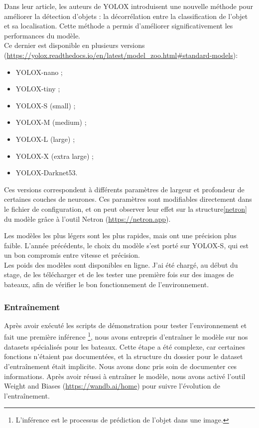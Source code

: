 Dans leur article, les auteurs de YOLOX \cite{Ge_Liu_Wang_Li_Sun_2021} introduisent une nouvelle méthode
pour améliorer la détection d'objets : la décorrélation entre la classification de l'objet et
sa localisation. Cette méthode a permis d'améliorer significativement les performances du modèle.\\

Ce dernier est disponible en plusieurs versions (\url{https://yolox.readthedocs.io/en/latest/model_zoo.html#standard-models}):
\begin{itemize}
    \item YOLOX-nano ;
    \item YOLOX-tiny ;
    \item YOLOX-S (small) ;
    \item YOLOX-M (medium) ;
    \item YOLOX-L (large) ;
    \item YOLOX-X (extra large) ;
    \item YOLOX-Darknet53.
\end{itemize}

Ces versions correspondent à différents paramètres de largeur et profondeur de certaines couches de neurones.
Ces paramètres sont modifiables directement dans le fichier de configuration,
et on peut observer leur effet sur la structure\ref{netron} du modèle grâce à l'outil Netron
(\url{https://netron.app}).

Les modèles les plus légers sont les plus rapides, mais ont une précision plus faible.
L'année précédents, le choix du modèle s'est porté sur YOLOX-S, qui est un bon compromis entre
vitesse et précision.\\

Les poids des modèles sont disponibles en ligne. J'ai été chargé, au début du stage, de les
télécharger et de les tester une première fois sur des images de bateaux, afin de vérifier
le bon fonctionnement de l'environnement.\\

\subsubsection{Entraînement}

Après avoir exécuté les scripts de démonstration pour tester l'environnement
et fait une première inférence \footnote{L'inférence est le processus de prédiction
de l'objet dans une image.}, nous avons entrepris d'entraîner le modèle sur nos datasets spécialisés pour
les bateaux. Cette étape a été complexe, car certaines fonctions n'étaient pas documentées, et
la structure du dossier pour le dataset d'entraînement était implicite. Nous avons donc pris soin de documenter
ces informations. Après avoir réussi à entraîner le modèle, nous avons activé l'outil
Weight and Biases (\url{https://wandb.ai/home}) pour suivre l'évolution de l'entraînement.\\


